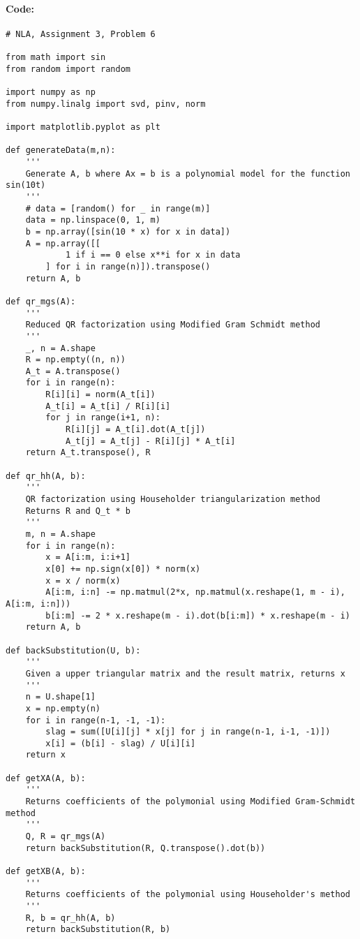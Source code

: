 \documentclass[12pt, letterpaper]{article}
\begin{document}
\paragraph{Code:}

\begin{verbatim}
# NLA, Assignment 3, Problem 6

from math import sin
from random import random

import numpy as np
from numpy.linalg import svd, pinv, norm

import matplotlib.pyplot as plt

def generateData(m,n):
    '''
    Generate A, b where Ax = b is a polynomial model for the function sin(10t)
    '''
    # data = [random() for _ in range(m)]
    data = np.linspace(0, 1, m)
    b = np.array([sin(10 * x) for x in data])
    A = np.array([[
            1 if i == 0 else x**i for x in data
        ] for i in range(n)]).transpose()
    return A, b

def qr_mgs(A):
    '''
    Reduced QR factorization using Modified Gram Schmidt method
    '''
    _, n = A.shape
    R = np.empty((n, n))
    A_t = A.transpose()
    for i in range(n):
        R[i][i] = norm(A_t[i])
        A_t[i] = A_t[i] / R[i][i]
        for j in range(i+1, n):
            R[i][j] = A_t[i].dot(A_t[j])
            A_t[j] = A_t[j] - R[i][j] * A_t[i]
    return A_t.transpose(), R

def qr_hh(A, b):
    '''
    QR factorization using Householder triangularization method
    Returns R and Q_t * b
    '''
    m, n = A.shape
    for i in range(n):
        x = A[i:m, i:i+1]
        x[0] += np.sign(x[0]) * norm(x)
        x = x / norm(x)
        A[i:m, i:n] -= np.matmul(2*x, np.matmul(x.reshape(1, m - i), A[i:m, i:n]))
        b[i:m] -= 2 * x.reshape(m - i).dot(b[i:m]) * x.reshape(m - i)
    return A, b

def backSubstitution(U, b):
    '''
    Given a upper triangular matrix and the result matrix, returns x
    '''
    n = U.shape[1]
    x = np.empty(n)
    for i in range(n-1, -1, -1):
        slag = sum([U[i][j] * x[j] for j in range(n-1, i-1, -1)])
        x[i] = (b[i] - slag) / U[i][i]
    return x

def getXA(A, b):
    '''
    Returns coefficients of the polymonial using Modified Gram-Schmidt method
    '''
    Q, R = qr_mgs(A)
    return backSubstitution(R, Q.transpose().dot(b))

def getXB(A, b):
    '''
    Returns coefficients of the polymonial using Householder's method
    '''
    R, b = qr_hh(A, b)
    return backSubstitution(R, b)


\end{verbatim}
\end{document}
